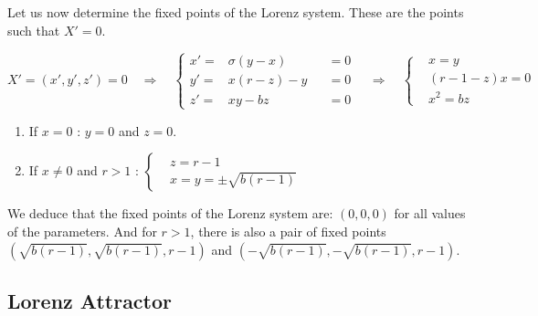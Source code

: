 \documentclass[12pt]{article}
\begin{document}
	\noindent Let us now determine the fixed points of the Lorenz system. These are the points such that $X'=0$. 
	
	$$
	X'=(x',y',z')=0
	\quad \Rightarrow \quad 
	\left\{\begin{aligned}
		x'=&\sigma(y-x) &&=0 \\
		y'=&x(r-z)-y  &&=0\\
		z'=&xy-bz &&=0
	\end{aligned}\right. 
	\quad \Rightarrow \quad 
	\left\{\begin{aligned}
		&x=y \\
		&(r-1-z)x=0\\
		&x^2=bz
	\end{aligned}\right.
	$$
	
	\begin{enumerate}[label=\textbullet]
		\item If $x=0$ : \quad  $y=0$ and $z=0$.
		\item If $x\ne 0$ and $r>1$ : \quad $\left\{\begin{aligned}
			&z=r-1\\
			&x=y=\pm\sqrt{b(r-1)}
		\end{aligned}\right.
		$
	\end{enumerate}
	
	\noindent We deduce that the fixed points of the Lorenz system are: $(0,0,0)$ for all values of the parameters. And for $r>1$, there is also a pair of fixed points $(\sqrt{b(r-1)},\sqrt{b(r-1)},r-1)$ and $(-\sqrt{b(r-1)},-\sqrt{b(r-1)},r-1)$.
	
	\subsection{Lorenz Attractor}
	
\end{document}
